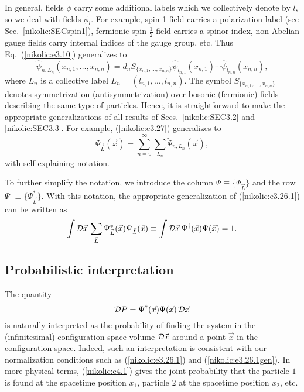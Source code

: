 \documentclass[12pt,twoside]{report} %
\begin{document}
In general, fields $\phi$ carry some additional labels which we 
collectively denote by $l$, so we deal with fields $\phi_l$.
For example, spin 1 field carries a
polarization label (see Sec.~\ref{nikolic:SECspin1}), 
fermionic spin $\frac{1}{2}$ field carries a spinor index,
non-Abelian gauge fields carry internal indices of the gauge group, etc.
Thus Eq.~(\ref{nikolic:e3.10}) generalizes to
\begin{equation}\label{nikolic:e3.10gen}
  \hat{\psi}_{n,L_n}(x_{n,1}, \ldots , x_{n,n}) = 
 d_n 
S_{ \{x_{n,1}, \ldots , x_{n,n} \} } 
\hat{\psi}_{l_{n,1}}(x_{n,1}) \cdots \hat{\psi}_{l_{n,n}} (x_{n,n}) , 
\end{equation}
where $L_n$ is a collective label $L_n=(l_{n,1}, \ldots , l_{n,n} )$.
The symbol $S_{ \{x_{n,1}, \ldots , x_{n,n} \} }$ denotes symmetrization (antisymmetrization) over bosonic (fermionic) fields describing the same type of particles.
Hence, it is straightforward to make the appropriate generalizations of all results
of Secs.~\ref{nikolic:SEC3.2} and \ref{nikolic:SEC3.3}. For example, (\ref{nikolic:e3.27})
generalizes to 
\begin{equation}\label{nikolic:e3.27gen}
\Psi_{\vec{L}} (\vec{x}) = \sum_{n=0}^{\infty} \sum_{L_n} \tilde{\Psi}_{n,L_n}
(\vec{x}) ,
\end{equation}
with self-explaining notation.

To further simplify the notation, we introduce the column 
$\Psi\equiv \{\Psi_{\vec{L}} \}$ and the row
$\Psi^{\dagger}\equiv \{\Psi^*_{\vec{L}} \}$.
With this notation, the appropriate generalization of (\ref{nikolic:e3.26.1}) can be written as
\begin{equation}\label{nikolic:e3.26.1gen}
 \int {\cal D}\vec{x} \, \sum_{{\vec{L}}} \Psi^*_{\vec{L}}(\vec{x})
\Psi_{\vec{L}}(\vec{x}) \equiv \int {\cal D}\vec{x} \,
\Psi^{\dagger}(\vec{x}) \Psi(\vec{x})
=1 .
\end{equation}



\subsection{Probabilistic interpretation}

The quantity
\begin{equation}\label{nikolic:e4.1}
 {\cal D}P=\Psi^{\dagger}(\vec{x}) \Psi(\vec{x}) \, {\cal D}\vec{x}
\end{equation}
is naturally interpreted as the probability of finding the system in the 
(infinitesimal) configuration-space volume ${\cal D}\vec{x}$ around a 
point $\vec{x}$ in the configuration space. Indeed, such an interpretation
is consistent with our normalization conditions such as 
(\ref{nikolic:e3.26.1}) and (\ref{nikolic:e3.26.1gen}). In more physical terms, 
(\ref{nikolic:e4.1}) gives the 
joint probability that the particle $1$ is found at the spacetime position 
$x_1$,  particle $2$ at the spacetime position $x_2$, etc.
\end{document}
